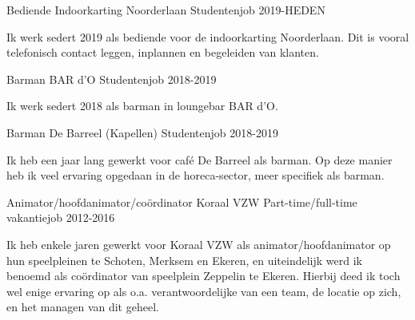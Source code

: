 
\begin{cventries}

    \cventry
    {Bediende} %
    {Indoorkarting Noorderlaan} %
    {Studentenjob} %
    {2019-HEDEN} %
    {
      \begin{cvitems} %
        \item {Ik werk sedert 2019 als bediende voor de indoorkarting Noorderlaan. Dit is vooral telefonisch contact leggen, inplannen en begeleiden van klanten.}
      \end{cvitems}
    }
    
    \cventry
    {Barman} %
    {BAR d'O} %
    {Studentenjob} %
    {2018-2019} %
    {
      \begin{cvitems} %
        \item {Ik werk sedert 2018 als barman in loungebar BAR d'O. }
      \end{cvitems}
    }

    \cventry
    {Barman} %
    {De Barreel (Kapellen)} %
    {Studentenjob} %
    {2018-2019} %
    {
      \begin{cvitems} %
        \item {Ik heb een jaar lang gewerkt voor café De Barreel als barman. Op deze manier heb ik veel
ervaring opgedaan in de horeca-sector, meer specifiek als barman.}
      \end{cvitems}
    }
    
      \cventry
    {Animator/hoofdanimator/coördinator} %
    {Koraal VZW} %
    {Part-time/full-time vakantiejob} %
    {2012-2016} %
    {
      \begin{cvitems} %
        \item {Ik heb enkele jaren gewerkt voor Koraal VZW als animator/hoofdanimator op hun speelpleinen
te Schoten, Merksem en Ekeren, en uiteindelijk werd ik benoemd als coördinator van speelplein
Zeppelin te Ekeren. Hierbij deed ik toch wel enige ervaring op als o.a. verantwoordelijke van
een team, de locatie op zich, en het managen van dit geheel.}
      \end{cvitems}
    }
    
\end{cventries}
